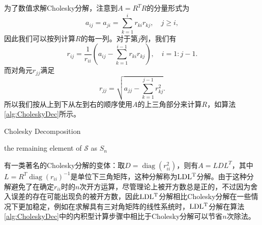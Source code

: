\documentclass[a4paper,10pt]{ctexart}
\begin{document}
为了数值求解Cholesky分解，注意到$ A = R^TR $的分量形式为
\[
    a_{ij} = a_{ji} = \sum_{k=1}^i r_{ki}r_{kj},\quad j\geqslant i,
\]
因此我们可以按列计算$ R $的每一列。对于第$ j $列，我们有
\begin{equation}\label{eq:CholeskyDec}
    r_{ij} = \frac{1}{r_{ii}}\left( a_{ij} - \sum_{k=1}^{i-1} r_{ki}r_{kj} \right),\quad i = 1:j-1.
\end{equation}
而对角元$ r_{jj} $满足
\begin{equation}
    r_{jj} = \sqrt{a_{jj} - \sum_{k=1}^{j-1} r_{kj}^2}.
\end{equation}
所以我们按从上到下从左到右的顺序使用$ A $的上三角部分来计算$ R $，如算法\ref{alg:CholeskyDec}所示。
\begin{algorithm}[htbp]
    \caption{Cholesky Decomposition}\label{alg:CholeskyDec}
    \Return the remaining element of $ \mathcal{S} $ as $ S_n $\;
\end{algorithm}

有一类著名的Cholesky分解的变体：取$ D = \operatorname{diag} (r_{ii}^2)$，则有$ A= LDL^T $，其中$ L = R^T \operatorname{diag}(r_{ii})^{-1} $是单位下三角矩阵，这种分解称为$ {\rm LDL^T} $分解。由于这种分解避免了在确定$ r_{ii} $时的$ n $次开方运算，尽管理论上被开方数总是正的，不过因为舍入误差的存在可能出现负的被开方数，因此$ {\rm LDL^T} $分解相比Cholesky分解在一些情况下更加稳定，例如在求解具有三对角矩阵的线性系统时，$ {\rm LDL^T} $分解在算法\ref{alg:CholeskyDec}中的内积型计算步骤中相比于Cholesky分解可以节省$ n $次除法。
\end{document}
